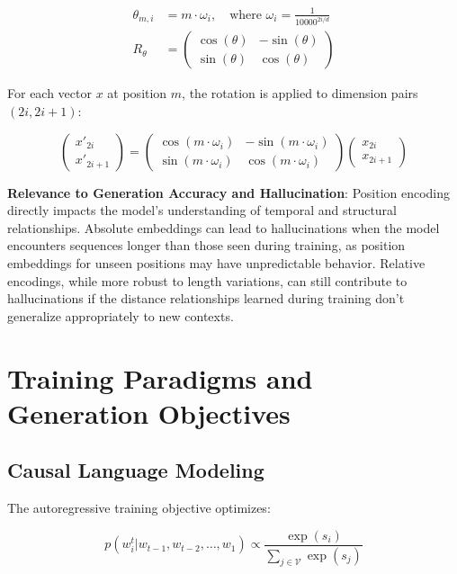 \begin{align}
\theta_{m,i} &= m \cdot \omega_i, \quad \text{where } \omega_i = \frac{1}{10000^{2i/d}} \\
R_\theta &= \begin{pmatrix}
\cos(\theta) & -\sin(\theta) \\
\sin(\theta) & \cos(\theta)
\end{pmatrix}
\end{align}

For each vector $x$ at position $m$, the rotation is applied to dimension pairs $(2i, 2i+1)$:

\begin{equation}
\begin{pmatrix}
x'_{2i} \\
x'_{2i+1}
\end{pmatrix} = \begin{pmatrix}
\cos(m \cdot \omega_i) & -\sin(m \cdot \omega_i) \\
\sin(m \cdot \omega_i) & \cos(m \cdot \omega_i)
\end{pmatrix} \begin{pmatrix}
x_{2i} \\
x_{2i+1}
\end{pmatrix}
\end{equation}

\textbf{Relevance to Generation Accuracy and Hallucination}: Position encoding directly impacts the model's understanding of temporal and structural relationships. Absolute embeddings can lead to hallucinations when the model encounters sequences longer than those seen during training, as position embeddings for unseen positions may have unpredictable behavior. Relative encodings, while more robust to length variations, can still contribute to hallucinations if the distance relationships learned during training don't generalize appropriately to new contexts.

\section{Training Paradigms and Generation Objectives}

\subsection{Causal Language Modeling}

The autoregressive training objective optimizes:

\begin{equation}
p(w_i^t | w_{t-1}, w_{t-2}, \ldots, w_1) \propto \frac{\exp(s_i)}{\sum_{j \in \mathcal{V}} \exp(s_j)}
\end{equation}

